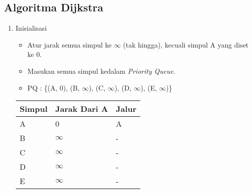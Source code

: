 \subsection{Algoritma Dijkstra}
\begin{enumerate}
    \item Inisialisasi
    \begin{itemize}
        \item Atur jarak semua simpul ke $\infty$ (tak hingga), kecuali simpul A yang diset ke 0.
        \item Masukan semua simpul kedalam \textit{Priority Queue}.
        \item PQ : \{(A, 0), (B, $\infty$), (C, $\infty$), (D, $\infty$), (E, $\infty$)\}
    \end{itemize}
    \begin{table}[h]
        \begin{tabular}{|l|l|l|}
        \hline
            \textbf{Simpul} & \textbf{Jarak Dari A} & Jalur \\ \hline
            A               & 0                     & A     \\ \hline
            B               & $\infty$              & -     \\ \hline
            C               & $\infty$              & -     \\ \hline
            D               & $\infty$              & -     \\ \hline
            E               & $\infty$              & -     \\ \hline
        \end{tabular}
    \end{table}
    

\end{enumerate}
